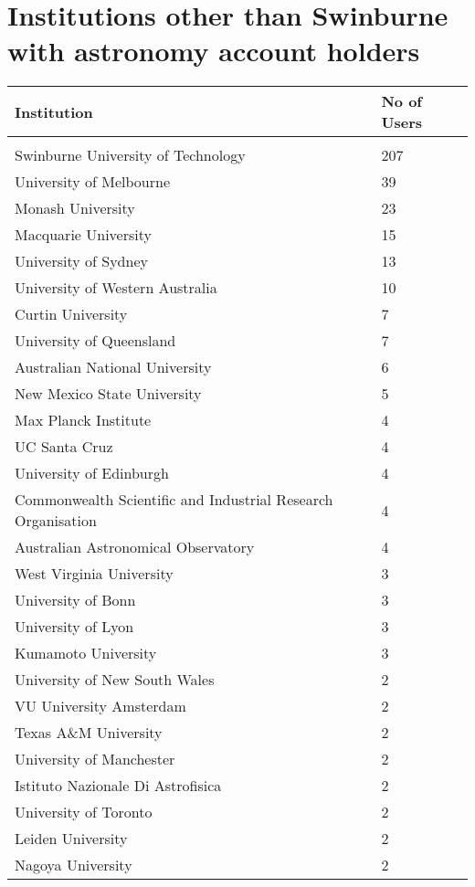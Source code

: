 \documentclass{article}%
\begin{document}
\section{Institutions other than Swinburne with astronomy account holders}%

%
\begin{longtabu}{X[l] X[r]}%
\textbf{Institution}&\textbf{No of Users}\\%
\hline%
&\\%
Swinburne University of Technology&207\\%
\hline%
University of Melbourne&39\\%
\hline%
Monash University&23\\%
\hline%
Macquarie University&15\\%
\hline%
University of Sydney&13\\%
\hline%
University of Western Australia&10\\%
\hline%
Curtin University&7\\%
\hline%
University of Queensland&7\\%
\hline%
Australian National University&6\\%
\hline%
New Mexico State University&5\\%
\hline%
Max Planck Institute&4\\%
\hline%
UC Santa Cruz&4\\%
\hline%
University of Edinburgh&4\\%
\hline%
Commonwealth Scientific and Industrial Research Organisation&4\\%
\hline%
Australian Astronomical Observatory&4\\%
\hline%
West Virginia University&3\\%
\hline%
University of Bonn&3\\%
\hline%
University of Lyon&3\\%
\hline%
Kumamoto University&3\\%
\hline%
University of New South Wales&2\\%
\hline%
VU University Amsterdam&2\\%
\hline%
Texas A\&M University&2\\%
\hline%
University of Manchester&2\\%
\hline%
Istituto Nazionale Di Astrofisica&2\\%
\hline%
University of Toronto&2\\%
\hline%
Leiden University&2\\%
\hline%
Nagoya University&2\\%

\end{longtabu}
\end{document}
